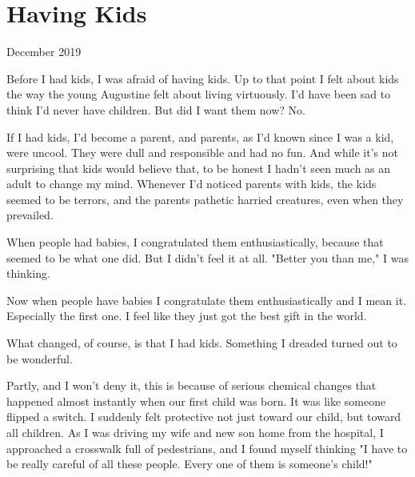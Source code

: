 \chapter{Having Kids}


            
              
                

December 2019

Before I had kids, I was afraid of
                  having kids. Up to that point I felt about kids the way the
                  young Augustine felt about living virtuously. I'd have been
                  sad to think I'd never have children. But did I want them now?
                  No.

If I had kids, I'd become a parent, and
                  parents, as I'd known since I was a kid, were uncool. They
                  were dull and responsible and had no fun. And while it's not
                  surprising that kids would believe that, to be honest I hadn't
                  seen much as an adult to change my mind. Whenever I'd noticed
                  parents with kids, the kids seemed to be terrors, and the
                  parents pathetic harried creatures, even when they
                  prevailed.

When people had babies, I congratulated
                  them enthusiastically, because that seemed to be what one did.
                  But I didn't feel it at all. "Better you than me," I was
                  thinking.

Now when people have babies I
                  congratulate them enthusiastically and I mean it. Especially
                  the first one. I feel like they just got the best gift in the
                  world.

What changed, of course, is that I had kids.
                  Something I dreaded turned out to be wonderful.

Partly,
                  and I won't deny it, this is because of serious chemical
                  changes that happened almost instantly when our first child
                  was born. It was like someone flipped a switch. I suddenly
                  felt protective not just toward our child, but toward all
                  children. As I was driving my wife and new son home from the
                  hospital, I approached a crosswalk full of pedestrians, and I
                  found myself thinking "I have to be really careful of all
                  these people. Every one of them is someone's child!"

